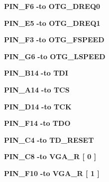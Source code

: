 \begin{DoxyCompactItemize}
\item 
{\bf P\+I\+N\+\_\+\+F6} {\bfseries \textcolor{vhdlchar}{-\/}\textcolor{keywordflow}{to}\textcolor{vhdlchar}{ }\textcolor{vhdlchar}{O\+T\+G\+\_\+\+D\+R\+E\+Q0}\textcolor{vhdlchar}{ }} 
\item 
{\bf P\+I\+N\+\_\+\+E5} {\bfseries \textcolor{vhdlchar}{-\/}\textcolor{keywordflow}{to}\textcolor{vhdlchar}{ }\textcolor{vhdlchar}{O\+T\+G\+\_\+\+D\+R\+E\+Q1}\textcolor{vhdlchar}{ }} 
\item 
{\bf P\+I\+N\+\_\+\+F3} {\bfseries \textcolor{vhdlchar}{-\/}\textcolor{keywordflow}{to}\textcolor{vhdlchar}{ }\textcolor{vhdlchar}{O\+T\+G\+\_\+\+F\+S\+P\+E\+ED}\textcolor{vhdlchar}{ }} 
\item 
{\bf P\+I\+N\+\_\+\+G6} {\bfseries \textcolor{vhdlchar}{-\/}\textcolor{keywordflow}{to}\textcolor{vhdlchar}{ }\textcolor{vhdlchar}{O\+T\+G\+\_\+\+L\+S\+P\+E\+ED}\textcolor{vhdlchar}{ }} 
\item 
{\bf P\+I\+N\+\_\+\+B14} {\bfseries \textcolor{vhdlchar}{-\/}\textcolor{keywordflow}{to}\textcolor{vhdlchar}{ }\textcolor{vhdlchar}{T\+DI}\textcolor{vhdlchar}{ }} 
\item 
{\bf P\+I\+N\+\_\+\+A14} {\bfseries \textcolor{vhdlchar}{-\/}\textcolor{keywordflow}{to}\textcolor{vhdlchar}{ }\textcolor{vhdlchar}{T\+CS}\textcolor{vhdlchar}{ }} 
\item 
{\bf P\+I\+N\+\_\+\+D14} {\bfseries \textcolor{vhdlchar}{-\/}\textcolor{keywordflow}{to}\textcolor{vhdlchar}{ }\textcolor{vhdlchar}{T\+CK}\textcolor{vhdlchar}{ }} 
\item 
{\bf P\+I\+N\+\_\+\+F14} {\bfseries \textcolor{vhdlchar}{-\/}\textcolor{keywordflow}{to}\textcolor{vhdlchar}{ }\textcolor{vhdlchar}{T\+DO}\textcolor{vhdlchar}{ }} 
\item 
{\bf P\+I\+N\+\_\+\+C4} {\bfseries \textcolor{vhdlchar}{-\/}\textcolor{keywordflow}{to}\textcolor{vhdlchar}{ }\textcolor{vhdlchar}{T\+D\+\_\+\+R\+E\+S\+ET}\textcolor{vhdlchar}{ }} 
\item 
{\bf P\+I\+N\+\_\+\+C8} {\bfseries \textcolor{vhdlchar}{-\/}\textcolor{keywordflow}{to}\textcolor{vhdlchar}{ }\textcolor{vhdlchar}{V\+G\+A\+\_\+R}\textcolor{vhdlchar}{ }\textcolor{vhdlchar}{[}\textcolor{vhdlchar}{ } \textcolor{vhdldigit}{0} \textcolor{vhdlchar}{ }\textcolor{vhdlchar}{]}\textcolor{vhdlchar}{ }} 
\item 
{\bf P\+I\+N\+\_\+\+F10} {\bfseries \textcolor{vhdlchar}{-\/}\textcolor{keywordflow}{to}\textcolor{vhdlchar}{ }\textcolor{vhdlchar}{V\+G\+A\+\_\+R}\textcolor{vhdlchar}{ }\textcolor{vhdlchar}{[}\textcolor{vhdlchar}{ } \textcolor{vhdldigit}{1} \textcolor{vhdlchar}{ }\textcolor{vhdlchar}{]}\textcolor{vhdlchar}{ }} 

\end{DoxyCompactItemize}

